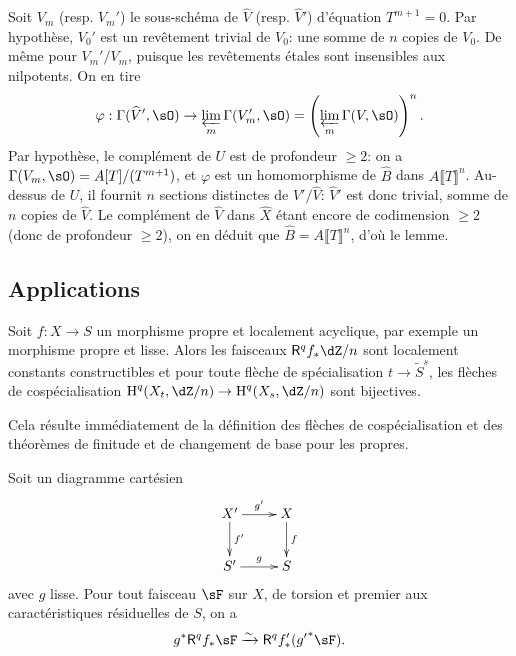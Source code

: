 Soit $V_m$ (resp. $V_m'$) le sous-schéma de $\widehat V$ (resp. $\widehat V'$) 
d'équation $T^{m+1} = 0$. Par hypothèse, $V_0'$ est un revêtement trivial 
de $V_0$: une somme de $n$ copies de $V_0$. De même pour $V_m'/V_m$, puisque 
les revêtements étales sont insensibles aux nilpotents. On en tire 
\[
  \varphi : \Gamma(\widehat V',\sO) \to \varprojlim_m \Gamma(V_m',\sO) = \left(\varprojlim_m \Gamma(V,\sO)\right)^n \text{.}
\]
Par hypothèse, le complément de $U$ est de profondeur $\geqslant 2$: on a 
$\Gamma(V_m,\sO)=A[T]/(T^{m+1})$, et $\varphi$ est un homomorphisme de 
$\widehat B$ dans $A\llbracket T\rrbracket^n$. Au-dessus de $U$, il fournit $n$ 
sections distinctes de $\widehat V'/\widehat V$: $\widehat V'$ est donc trivial, 
somme de $n$ copies de $\widehat V$. Le complément de $\widehat V$ dans 
$\widehat X$ étant encore de codimension $\geqslant 2$ (donc de profondeur 
$\geqslant 2$), on en déduit que $\widehat B=A\llbracket T\rrbracket^n$, 
d'où le lemme. 










\subsection{Applications}\label{I:5-3}





\begin{theorem}\label{I:5-3-1}
Soit $f:X\to S$ un morphisme propre et localement acyclique, par exemple un 
morphisme propre et lisse. Alors les faisceaux $\R^q f_*\dZ/n$ sont localement 
constants constructibles et pour toute flèche de spécialisation 
$t\to\widetilde S^s$, les flèches de cospécialisation 
$\h^q(X_t,\dZ/n)\to\h^q(X_s,\dZ/n)$ sont bijectives.
\end{theorem}

Cela résulte immédiatement de la définition des flèches de 
cospécialisation et des théorèmes de finitude et de changement de base pour 
les propres. 





\begin{theorem}\label{I:5-3-2}
Soit un diagramme cartésien 
\[\xymatrix{
  X' \ar[r]^-{g'} \ar[d]^-{f'} 
    & X \ar[d]^-f \\
  S' \ar[r]^-{g} 
    & S
}\]
avec $g$ lisse. Pour tout faisceau $\sF$ sur $X$, de torsion et premier aux 
caractéristiques résiduelles de $S$, on a 
\[
  g^* \R^q f_* \sF \iso \R^q f_*'({g'}^* \sF) \text{.}
\]
\end{theorem}

